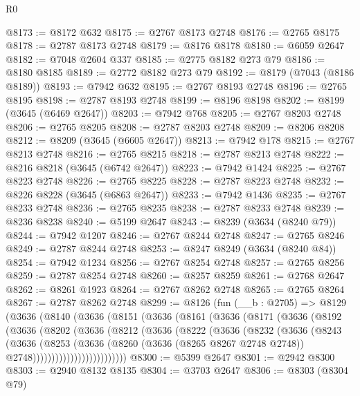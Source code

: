 \begin{lexlean}{R0}
\begin{coremodule}
@8173 := @8172 @632
@8175 := @2767 @8173 @2748
@8176 := @2765 @8175
@8178 := @2787 @8173 @2748
@8179 := @8176 @8178
@8180 := @6059 @2647
@8182 := @7048 @2604 @337
@8185 := @2775 @8182 @273 @79
@8186 := @8180 @8185
@8189 := @2772 @8182 @273 @79
@8192 := @8179 (@7043 (@8186 @8189))
@8193 := @7942 @632
@8195 := @2767 @8193 @2748
@8196 := @2765 @8195
@8198 := @2787 @8193 @2748
@8199 := @8196 @8198
@8202 := @8199 (@3645 (@6469 @2647))
@8203 := @7942 @768
@8205 := @2767 @8203 @2748
@8206 := @2765 @8205
@8208 := @2787 @8203 @2748
@8209 := @8206 @8208
@8212 := @8209 (@3645 (@6605 @2647))
@8213 := @7942 @178
@8215 := @2767 @8213 @2748
@8216 := @2765 @8215
@8218 := @2787 @8213 @2748
@8222 := @8216 @8218 (@3645 (@6742 @2647))
@8223 := @7942 @1424
@8225 := @2767 @8223 @2748
@8226 := @2765 @8225
@8228 := @2787 @8223 @2748
@8232 := @8226 @8228 (@3645 (@6863 @2647))
@8233 := @7942 @1436
@8235 := @2767 @8233 @2748
@8236 := @2765 @8235
@8238 := @2787 @8233 @2748
@8239 := @8236 @8238
@8240 := @5199 @2647
@8243 := @8239 (@3634 (@8240 @79))
@8244 := @7942 @1207
@8246 := @2767 @8244 @2748
@8247 := @2765 @8246
@8249 := @2787 @8244 @2748
@8253 := @8247 @8249 (@3634 (@8240 @84))
@8254 := @7942 @1234
@8256 := @2767 @8254 @2748
@8257 := @2765 @8256
@8259 := @2787 @8254 @2748
@8260 := @8257 @8259
@8261 := @2768 @2647
@8262 := @8261 @1923
@8264 := @2767 @8262 @2748
@8265 := @2765 @8264
@8267 := @2787 @8262 @2748
@8299 := @8126
    (fun (__b : @2705) =>
    @8129
      (@3636
        (@8140
          (@3636
            (@8151
              (@3636
                (@8161
                  (@3636
                    (@8171
                      (@3636
                        (@8192
                          (@3636
                            (@8202
                              (@3636
                                (@8212
                                  (@3636
                                    (@8222
                                      (@3636
                                        (@8232
                                          (@3636
                                            (@8243
                                              (@3636
                                                (@8253
                                                  (@3636
                                                    (@8260
                                                      (@3636 (@8265 @8267 @2748 @2748))
                                                      @2748)))))))))))))))))))))))))
@8300 := @5399 @2647
@8301 := @2942 @8300
@8303 := @2940 @8132 @8135
@8304 := @3703 @2647
@8306 := @8303 (@8304 @79)

\end{coremodule}
\end{lexlean}
